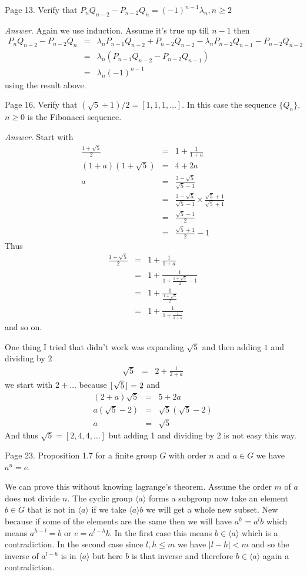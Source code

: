 \documentclass[aps,preprint,preprintnumbers,nofootinbib,showpacs,prd]{revtex4-1}
\newcommand{\nbea}{\begin{eqnarray*}}
\newcommand{\neea}{\end{eqnarray*}}
\DeclarePairedDelimiter{\floor}{\lfloor}{\rfloor}
\begin{document}
Page 13. Verify that $P_nQ_{n-2} - P_{n-2}Q_n = (-1)^{n-1} \lambda_n, n \ge 2$

{\it Answer}. Again we use induction. Assume it's true up till $n - 1$ then 
%
\nbea
P_nQ_{n-2} - P_{n-2}Q_n & = & \lambda_n P_{n - 1}Q_{n - 2} + P_{n - 2}Q_{n-2} - \lambda_nP_{n-2}Q_{n-1} - P_{n-2}Q_{n - 2} \\
& = & \lambda_n (P_{n-1}Q_{n - 2} - P_{n-2}Q_{n - 1}) \\
& = & \lambda_n(-1)^{n-1} 
\neea
%
using the result above.

Page 16. Verify that $(\sqrt{5} + 1)/2 = [1,1,1,\dots]$. In this case the sequence $\{Q_n\}$, $n \ge 0$ is the Fibonacci sequence.

{\it Answer}. Start with
%
\nbea
\frac{1 + \sqrt{5}}{2} & = & 1 + \frac{1}{1 + a} \\
(1 + a)(1 + \sqrt{5}) & = & 4 + 2a \\
a & = & \frac{3 - \sqrt{5}}{\sqrt{5} - 1} \\ 
& = & \frac{3 - \sqrt{5}}{\sqrt{5} - 1} \times \frac{\sqrt{5} + 1}{\sqrt{5} + 1} \\ 
& = & \frac{\sqrt{5} - 1}{2} \\
& = & \frac{\sqrt{5} + 1}{2} - 1
\neea
%
Thus
%
\nbea
\frac{1 + \sqrt{5}}{2} & = & 1 + \frac{1}{1 + a} \\
& = & 1 + \frac{1}{1 + \frac{1 + \sqrt{5}}{2} - 1} \\
& = & 1 + \frac{1}{\frac{1 + \sqrt{5}}{2}} \\
& = & 1 + \frac{1}{1 + \frac{1}{1 + a}} 
\neea
%
and so on. 

One thing I tried that didn't work was expanding $\sqrt{5}$ and then adding $1$ and dividing by $2$
%
\nbea
\sqrt{5} & = & 2 + \frac{1}{2 + a}
\neea
%
we start with $2 + \dots$ because $\floor{\sqrt{5}} = 2$ and 
%
\nbea
(2 + a)\sqrt{5} & = & 5 + 2a \\
a(\sqrt{5} - 2)& = & \sqrt{5}(\sqrt{5} - 2) \\
a & = & \sqrt{5}
\neea
%
And thus $\sqrt{5} = [2,4,4,\dots]$ but adding 1 and dividing by 2 is not easy this way.



Page 23. Proposition 1.7 for a finite group $G$ with order $n$ and $a \in G$ we have $a^n = e$.

We can prove this without knowing lagrange's theorem. Assume the order $m$ of $a$ does not divide $n$. The cyclic group $\langle a \rangle$ forms a subgroup now take an element $b\in G$ that is not in $\langle a \rangle$ if we take $\langle a \rangle b$ we will get a whole new subset. New because if some of the elements are the same then we will have $a^h = a^l b$ which means $a^{h-l} = b$ or $e = a^{l - h} b$. In the first case this means $b \in \langle a \rangle$ which is a contradiction. In the second case since $l,h \le m$ we have $|l - h| < m$ and so the inverse of $a^{l-h}$ is in $\langle a \rangle$ but here $b$ is that inverse and therefore $b \in \langle a \rangle$ again a contradiction.
\end{document}
